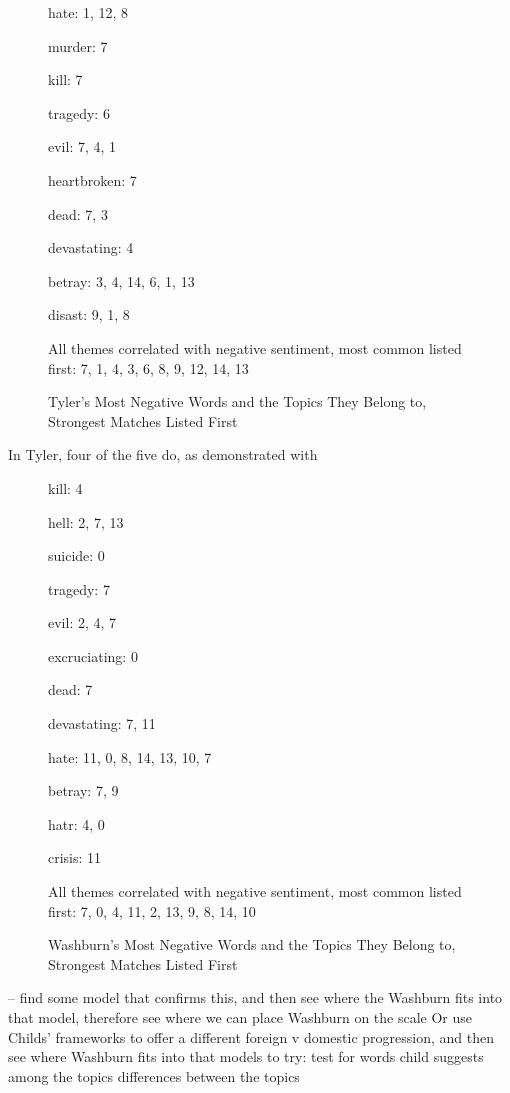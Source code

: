\documentclass[12pt]{article}
\begin{document}
\begin{flushleft}
\begin{spacing}{2.0}
\begin{figure}
	\caption{Tyler's Most Negative Words and the Topics They Belong to, Strongest Matches Listed First}
	\label{tyler-sentiment-topics}
	hate: 1, 12, 8
	
	murder: 7
	
	kill: 7
	
	tragedy: 6
	
	evil: 7, 4, 1
	
	heartbroken: 7
	
	dead: 7, 3
	
	devastating: 4
	
	betray: 3, 4, 14, 6, 1, 13
	
	disast: 9, 1, 8
	
	All themes correlated with negative sentiment, most common listed first: 7, 1, 4, 3, 6, 8, 9, 12, 14, 13
	
\end{figure}

In Tyler, four of the five do, as demonstrated with 

\begin{figure}
	\caption{Washburn's Most Negative Words and the Topics They Belong to, Strongest Matches Listed First}
	\label{washburn-sentiment-topics}
	kill: 4
	
	hell: 2, 7, 13
	
	suicide: 0
	
	tragedy: 7
	
	evil: 2, 4, 7
	
	excruciating: 0
	
	dead: 7
	
	devastating: 7, 11
	
	hate: 11, 0, 8, 14, 13, 10, 7
	
	betray: 7, 9
	
	hatr: 4, 0
	
	crisis: 11
	
	All themes correlated with negative sentiment, most common listed first: 7, 0, 4, 11, 2, 13, 9, 8, 14, 10
\end{figure}



-- find some model that confirms this, and then see where the Washburn fits into that model, therefore see where we can place Washburn on the scale
Or use Childs' frameworks to offer a different foreign v domestic progression, and then see where Washburn fits into that
models to try: test for words child suggests among the topics
differences between the topics 


\end{spacing}
\end{flushleft}
\end{document}
